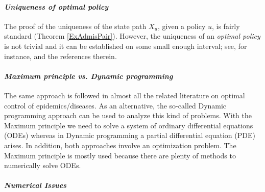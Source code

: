 \paragraph{\it Uniqueness of optimal policy}
The proof of the uniqueness of the state path $X_u$, given a policy $u$, is
fairly standard (Theorem \ref{ExAdmisPair}). However, the uniqueness of an 
{\it optimal policy} is not trivial and it can be established on some small 
enough interval; see, for instance, \cite{GaffSchaefer09} and the references 
therein.  
\medskip

\paragraph{\it Maximum principle vs. Dynamic programming} 
  The same approach is followed in almost all the related literature on optimal
control of epidemics/diseases. As an alternative, the so-called Dynamic
programming approach can be used to analyze this kind of problems. With the
Maximum principle we need to solve a system of ordinary differential equations
(ODEs) whereas in Dynamic programming a partial differential equation (PDE)
arises. In addition, both approaches involve an optimization problem. The
Maximum principle is mostly used because there are plenty of methods to
numerically solve ODEs.
\medskip
\paragraph{\it Numerical Issues}

\medskip
